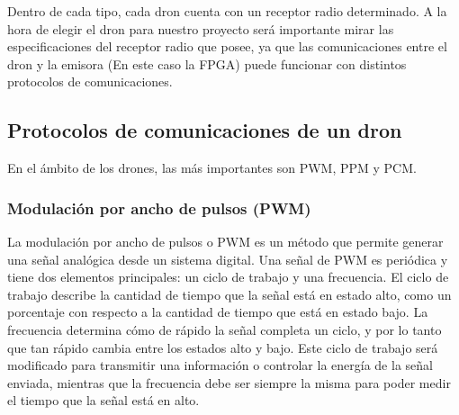 Dentro de cada tipo, cada dron cuenta con un receptor radio determinado. A la hora de elegir el dron para nuestro proyecto será importante mirar las especificaciones del receptor radio que posee, ya que las comunicaciones entre el dron y la emisora (En este caso la FPGA) puede funcionar con distintos protocolos de comunicaciones. 

\subsection{Protocolos de comunicaciones de un dron}\label{sec:comdron}

En el ámbito de los drones, las más importantes son PWM, PPM y PCM.

\subsubsection{Modulación por ancho de pulsos (PWM)}

La modulación por ancho de pulsos o PWM es un método que permite generar una señal analógica desde un sistema digital.  Una señal de PWM es periódica y tiene dos elementos principales: un ciclo de trabajo y una frecuencia. \newline El ciclo de trabajo describe la cantidad de tiempo que la señal está en estado alto, como un porcentaje con respecto a la cantidad de tiempo que está en estado bajo. La frecuencia determina cómo de rápido la señal completa un ciclo, y por lo tanto que tan rápido cambia entre los estados alto y bajo.  Este ciclo de trabajo será modificado para transmitir una información o controlar la energía de la señal enviada, mientras que la frecuencia debe ser siempre la misma para poder medir el tiempo que la señal está en alto. 

